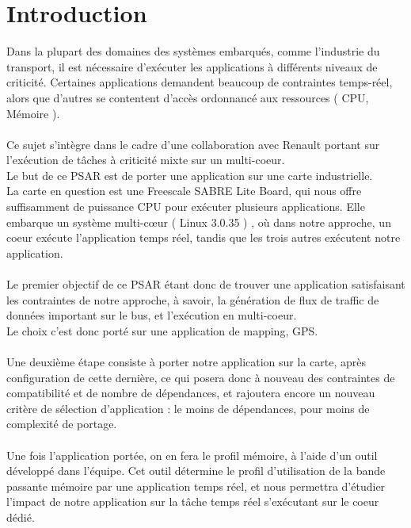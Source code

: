 \section{Introduction}

Dans la plupart des domaines des systèmes embarqués, comme l'industrie du transport, il est nécessaire d'exécuter les applications à différents niveaux de criticité. Certaines applications demandent beaucoup de contraintes temps-réel, alors que d'autres se contentent d'accès ordonnancé aux ressources ( CPU, Mémoire ).\\
\\
Ce sujet s'intègre dans le cadre d'une collaboration avec Renault portant sur l'exécution de tâches à criticité mixte sur un multi-coeur.\\
Le but de ce PSAR est de porter une application sur une carte industrielle.\\
La carte en question est une Freescale SABRE Lite Board, qui nous offre suffisamment de puissance CPU pour exécuter plusieurs applications. Elle embarque un système multi-cœur ( Linux 3.0.35 ) , où dans notre approche, un coeur exécute l'application temps réel, tandis que les trois autres exécutent notre application.\\
\\
Le premier objectif de ce PSAR étant donc de trouver une application satisfaisant les contraintes de notre approche, à savoir, la génération de flux de traffic de données important sur le bus, et l'exécution en multi-coeur.\\
Le choix c'est donc porté sur une application de mapping, GPS.\\
\\
Une deuxième étape consiste à porter notre application sur la carte, après configuration de cette dernière, ce qui posera donc à nouveau des contraintes de compatibilité et de nombre de dépendances, et rajoutera encore un nouveau critère de sélection d'application : le moins de dépendances, pour moins de complexité de portage.\\
\\
Une fois l'application portée, on en fera le profil mémoire, à l'aide d'un outil développé dans l'équipe. Cet outil détermine le profil d'utilisation de la bande passante mémoire par une application temps réel, et nous permettra d'étudier  l'impact de notre application sur la tâche temps réel s'exécutant sur le coeur dédié.\\
\\

\clearpage
